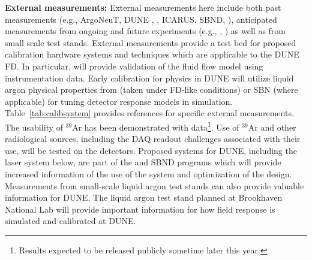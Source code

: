 \textbf{External measurements:} External measurements here include both past measurements (e.g., ArgoNeuT, DUNE , , ICARUS, SBND, \lariat), anticipated measurements from ongoing and future experiments (e.g., , ) as well as from small scale  test stands. External measurements provide a test bed for proposed calibration hardware systems and techniques which are applicable to the DUNE FD. In particular,  will provide validation of the fluid flow model using instrumentation data. Early calibration for physics in DUNE will utilize liquid argon physical properties from  (taken under FD-like conditions) or SBN (where applicable) for tuning detector response models in simulation. Table~\ref{tab:calibsystem} provides  references for specific external measurements. The usability of ${}^{39}$Ar has been demonstrated with \microboone data\footnote{Results expected to be released publicly sometime later this year.}. Use of  ${}^{39}$Ar  and other radiological sources, including the DAQ readout challenges associated with their use, will be tested on the    detectors. Proposed systems for DUNE, including the laser system below, are part of the \microboone and SBND programs which will provide increased information of the use of the system and optimization of the design. Measurements from small-scale liquid argon test stands can also provide valuable information for DUNE. The liquid argon test stand planned at Brookhaven National Lab will provide important information for how field response is simulated and calibrated at DUNE.




